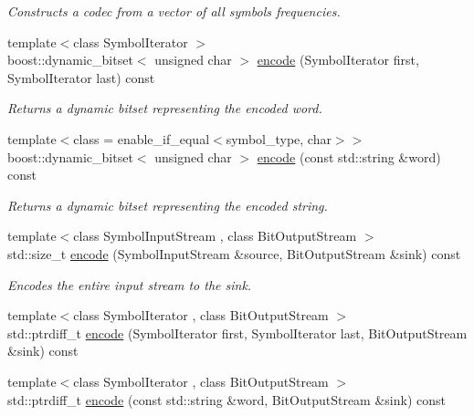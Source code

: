 \begin{DoxyCompactItemize}
\begin{DoxyCompactList}\small\item\em Constructs a codec from a vector of all symbols\textquotesingle{} frequencies. \end{DoxyCompactList}\item 
{\footnotesize template$<$class Symbol\+Iterator $>$ }\\boost\+::dynamic\+\_\+bitset$<$ unsigned char $>$ \mbox{\hyperlink{classirk_1_1hutucker__codec_a86c90c76d29d5badfd89b74efe7f1afd}{encode}} (Symbol\+Iterator first, Symbol\+Iterator last) const
\begin{DoxyCompactList}\small\item\em Returns a dynamic bitset representing the encoded word. \end{DoxyCompactList}\item 
{\footnotesize template$<$class  = enable\+\_\+if\+\_\+equal$<$symbol\+\_\+type, char$>$$>$ }\\boost\+::dynamic\+\_\+bitset$<$ unsigned char $>$ \mbox{\hyperlink{classirk_1_1hutucker__codec_a9f69f70ca8a04d326b6828e523500777}{encode}} (const std\+::string \&word) const
\begin{DoxyCompactList}\small\item\em Returns a dynamic bitset representing the encoded string. \end{DoxyCompactList}\item 
{\footnotesize template$<$class Symbol\+Input\+Stream , class Bit\+Output\+Stream $>$ }\\std\+::size\+\_\+t \mbox{\hyperlink{classirk_1_1hutucker__codec_a3f0df69a4d865e5f1e89e90b4f250dae}{encode}} (Symbol\+Input\+Stream \&source, Bit\+Output\+Stream \&sink) const
\begin{DoxyCompactList}\small\item\em Encodes the entire input stream to the sink. \end{DoxyCompactList}\item 
{\footnotesize template$<$class Symbol\+Iterator , class Bit\+Output\+Stream $>$ }\\std\+::ptrdiff\+\_\+t \mbox{\hyperlink{classirk_1_1hutucker__codec_aea36ea147fe323bcdcf4c82686c75abd}{encode}} (Symbol\+Iterator first, Symbol\+Iterator last, Bit\+Output\+Stream \&sink) const
\item 
{\footnotesize template$<$class Symbol\+Iterator , class Bit\+Output\+Stream $>$ }\\std\+::ptrdiff\+\_\+t \mbox{\hyperlink{classirk_1_1hutucker__codec_a4a2870c7684fab90126b45d7b5caaba9}{encode}} (const std\+::string \&word, Bit\+Output\+Stream \&sink) const

\end{DoxyCompactItemize}
